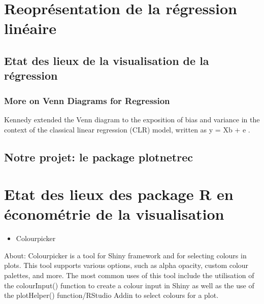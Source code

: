 \documentclass[
]{report}
\providecommand{\tightlist}{%
  \setlength{\itemsep}{0pt}\setlength{\parskip}{0pt}}
\begin{document}
\hypertarget{reopruxe9sentation-de-la-ruxe9gression-linuxe9aire}{%
\chapter{Reoprésentation de la régression linéaire}\label{reopruxe9sentation-de-la-ruxe9gression-linuxe9aire}}

\hypertarget{etat-des-lieux-de-la-visualisation-de-la-ruxe9gression}{%
\section{Etat des lieux de la visualisation de la régression}\label{etat-des-lieux-de-la-visualisation-de-la-ruxe9gression}}

\hypertarget{more-on-venn-diagrams-for-regression}{%
\subsection{More on Venn Diagrams for Regression}\label{more-on-venn-diagrams-for-regression}}

Kennedy \citep{kennedy} extended the Venn diagram to the exposition of bias and variance in the context of the classical linear regression (CLR) model, written as y = Xb + e .

\hypertarget{notre-projet-le-package-plotnetrec-1}{%
\section{Notre projet: le package plotnetrec}\label{notre-projet-le-package-plotnetrec-1}}

\hypertarget{etat-des-lieux-des-package-r-en-uxe9conomuxe9trie-de-la-visualisation}{%
\chapter{Etat des lieux des package R en économétrie de la visualisation}\label{etat-des-lieux-des-package-r-en-uxe9conomuxe9trie-de-la-visualisation}}

\begin{itemize}
\tightlist
\item
  Colourpicker
\end{itemize}

About: Colourpicker is a tool for Shiny framework and for selecting colours in plots. This tool supports various options, such as alpha opacity, custom colour palettes, and more. The most common uses of this tool include the utilisation of the colourInput() function to create a colour input in Shiny as well as the use of the plotHelper() function/RStudio Addin to select colours for a plot.
\end{document}
